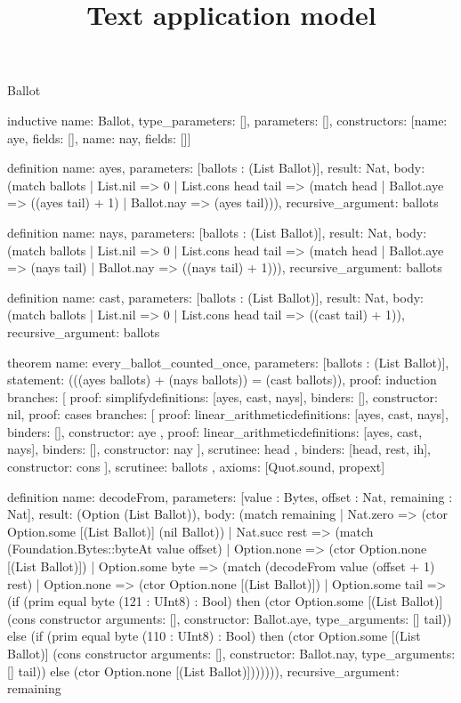 \begin{lexlean}{Ballot}
\title{Text application model}
\begin{semanticmodule}
inductive{
  name: Ballot,
  type_parameters: [],
  parameters: [],
  constructors: [{name: aye, fields: []}, {name: nay, fields: []}]
}

definition{
  name: ayes,
  parameters: [ballots : (List Ballot)],
  result: Nat,
  body: (match ballots
    | List.nil => 0
    | List.cons head tail => (match head
      | Ballot.aye => ((ayes tail) + 1)
      | Ballot.nay => (ayes tail))),
  recursive_argument: ballots
}

definition{
  name: nays,
  parameters: [ballots : (List Ballot)],
  result: Nat,
  body: (match ballots
    | List.nil => 0
    | List.cons head tail => (match head
      | Ballot.aye => (nays tail)
      | Ballot.nay => ((nays tail) + 1))),
  recursive_argument: ballots
}

definition{
  name: cast,
  parameters: [ballots : (List Ballot)],
  result: Nat,
  body: (match ballots | List.nil => 0 | List.cons head tail => ((cast tail) + 1)),
  recursive_argument: ballots
}

theorem{
  name: every_ballot_counted_once,
  parameters: [ballots : (List Ballot)],
  statement: (((ayes ballots) + (nays ballots)) = (cast ballots)),
  proof: induction{
    branches: [
      {proof: simplify{definitions: [ayes, cast, nays]}, binders: [], constructor: nil},
      {
        proof: cases{
          branches: [
            {
              proof: linear_arithmetic{definitions: [ayes, cast, nays]},
              binders: [],
              constructor: aye
            },
            {
              proof: linear_arithmetic{definitions: [ayes, cast, nays]},
              binders: [],
              constructor: nay
            }
          ],
          scrutinee: head
        },
        binders: [head, rest, ih],
        constructor: cons
      }
    ],
    scrutinee: ballots
  },
  axioms: [Quot.sound, propext]
}

definition{
  name: decodeFrom,
  parameters: [value : Bytes, offset : Nat, remaining : Nat],
  result: (Option (List Ballot)),
  body: (match remaining
    | Nat.zero => (ctor Option.some [(List Ballot)] (nil Ballot))
    | Nat.succ rest => (match (Foundation.Bytes::byteAt value offset)
      | Option.none => (ctor Option.none [(List Ballot)])
      | Option.some byte => (match (decodeFrom value (offset + 1) rest)
        | Option.none => (ctor Option.none [(List Ballot)])
        | Option.some tail => (if (prim equal byte (121 : UInt8) : Bool) then (ctor Option.some [(List Ballot)] (cons constructor{
          arguments: [],
          constructor: Ballot.aye,
          type_arguments: []
        } tail)) else (if (prim equal byte (110 : UInt8) : Bool) then (ctor Option.some [(List Ballot)] (cons constructor{
          arguments: [],
          constructor: Ballot.nay,
          type_arguments: []
        } tail)) else (ctor Option.none [(List Ballot)])))))),
  recursive_argument: remaining
}


\end{semanticmodule}
\end{lexlean}
